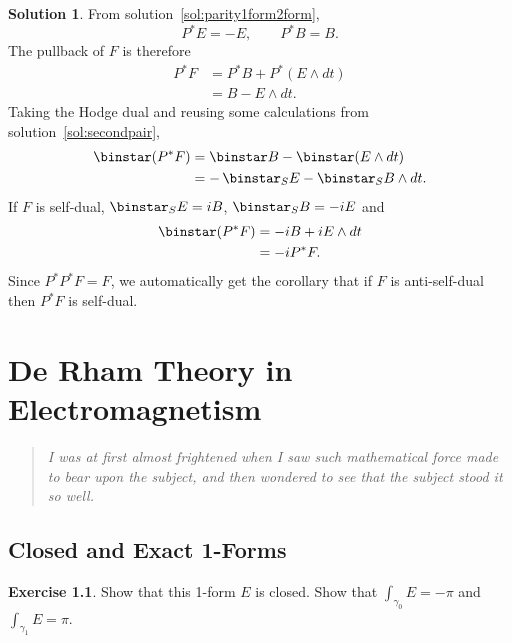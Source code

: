 \documentclass[11pt, a4paper]{report}
\theoremstyle{definition}
\newtheorem{exercise}{Exercise}[part]
\newtheorem{solution}{Solution}[part]
\newenvironment{ex}{\begin{exercise}}{\end{exercise}\pagebreak[1]}
\newenvironment{sol}{\begin{solution}}{\end{solution}\pagebreak[3]}
\newenvironment{epigraph}
    {\begin{quote}\small\itshape} %
    {\end{quote}\ignorespacesafterend\vspace{\parskip}}
\newcommand*{\op}[1]{\ensuremath\mathop{}\mathopen{}#1}
\renewcommand*{\star}{\op{\binstar}\mathord{}}
\begin{document}
\begin{sol}

From solution~\ref{sol:parity1form2form},
\[
    P^* E = -E, \qquad
    P^* B = B.
\]
The pullback of $F$ is therefore
\begin{align*}
    P^* F &= P^* B + P^* (E \wedge dt) \\
          &= B - E \wedge dt.
\end{align*}
Taking the Hodge dual and reusing some calculations from solution~\ref{sol:secondpair},
\begin{align*}
    \star(P^* F) &= \star B - \star(E \wedge dt) \\
                 &= -\star_S E - \star_S B \wedge dt.
\end{align*}
If $F$ is self-dual, $\star_S E = iB$, $\star_S B = -i E$ and
\begin{align*}
    \star(P^* F) &= -iB + iE \wedge dt \\
                 &= -i P^* F.
\end{align*}
Since $P^* P^* F = F$, we automatically get the corollary that if $F$ is anti-self-dual then $P^* F$ is self-dual.

\end{sol}

\chapter{De Rham Theory in Electromagnetism}

\begin{epigraph}
    I was at first almost frightened when I saw such mathematical force made to bear upon the subject, and then wondered to see that the subject stood it so well.
\end{epigraph}

\section{Closed and Exact 1-Forms}

\begin{ex}

Show that this 1-form $E$ is closed. Show that $\int_{\gamma_0} E = -\pi$ and $\int_{\gamma_1} E = \pi$.

\end{ex}
\end{document}
